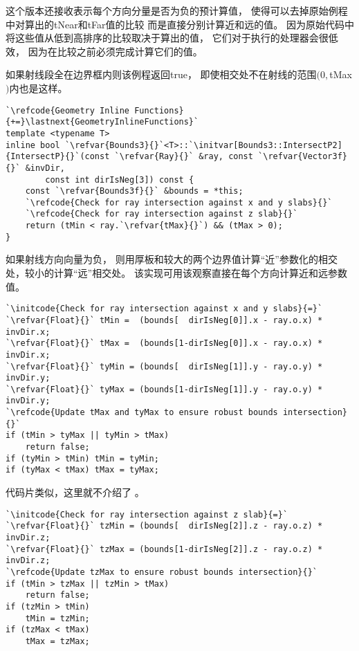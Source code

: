 这个版本还接收表示每个方向分量是否为负的预计算值，
使得可以去掉原始例程中对算出的{\ttfamily tNear}和{\ttfamily tFar}值的比较
而是直接分别计算近和远的值。
因为原始代码中将这些值从低到高排序的比较取决于算出的值，
它们对于执行的处理器会很低效，
因为在比较之前必须完成计算它们的值。

如果射线段全在边界框内则该例程返回{\ttfamily true}，
即使相交处不在射线的范围$(0,${\ttfamily tMax}$)$内也是这样。
\begin{lstlisting}
`\refcode{Geometry Inline Functions}{+=}\lastnext{GeometryInlineFunctions}`
template <typename T>
inline bool `\refvar{Bounds3}{}`<T>::`\initvar[Bounds3::IntersectP2]{IntersectP}{}`(const `\refvar{Ray}{}` &ray, const `\refvar{Vector3f}{}` &invDir,
        const int dirIsNeg[3]) const {
    const `\refvar{Bounds3f}{}` &bounds = *this;
    `\refcode{Check for ray intersection against x and y slabs}{}`
    `\refcode{Check for ray intersection against z slab}{}`
    return (tMin < ray.`\refvar{tMax}{}`) && (tMax > 0);
}
\end{lstlisting}

如果射线方向向量为负，
则用厚板和较大的两个边界值计算“近”参数化的相交处，较小的计算“远”相交处。
该实现可用该观察直接在每个方向计算近和远参数值。
\begin{lstlisting}
`\initcode{Check for ray intersection against x and y slabs}{=}`
`\refvar{Float}{}` tMin =  (bounds[  dirIsNeg[0]].x - ray.o.x) * invDir.x;
`\refvar{Float}{}` tMax =  (bounds[1-dirIsNeg[0]].x - ray.o.x) * invDir.x;
`\refvar{Float}{}` tyMin = (bounds[  dirIsNeg[1]].y - ray.o.y) * invDir.y;
`\refvar{Float}{}` tyMax = (bounds[1-dirIsNeg[1]].y - ray.o.y) * invDir.y;
`\refcode{Update tMax and tyMax to ensure robust bounds intersection}{}`
if (tMin > tyMax || tyMin > tMax) 
    return false;
if (tyMin > tMin) tMin = tyMin; 
if (tyMax < tMax) tMax = tyMax;
\end{lstlisting}

代码片类似，这里就不介绍了
。
\begin{lstlisting}
`\initcode{Check for ray intersection against z slab}{=}`
`\refvar{Float}{}` tzMin = (bounds[  dirIsNeg[2]].z - ray.o.z) * invDir.z;
`\refvar{Float}{}` tzMax = (bounds[1-dirIsNeg[2]].z - ray.o.z) * invDir.z;
`\refcode{Update tzMax to ensure robust bounds intersection}{}`
if (tMin > tzMax || tzMin > tMax)
    return false;
if (tzMin > tMin)
    tMin = tzMin;
if (tzMax < tMax)
    tMax = tzMax;
\end{lstlisting}

